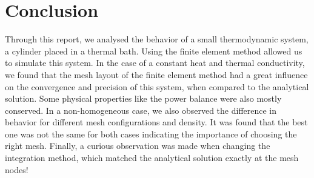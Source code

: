 \section{Conclusion}

Through this report, we analysed the behavior of a small thermodynamic system, a cylinder placed in a thermal bath. Using the finite element method allowed us to simulate this system. In the case of a constant heat and thermal conductivity, we found that the mesh layout of the finite element method had a great influence on the convergence and precision of this system, when compared to the analytical solution. Some physical properties like the power balance were also mostly conserved. In a non-homogeneous case, we also observed the difference in behavior for different mesh configurations and density. It was found that the best one was not the same for both cases indicating the importance of choosing the right mesh. Finally, a curious observation was made when changing the integration method, which matched the analytical solution exactly at the mesh nodes!
